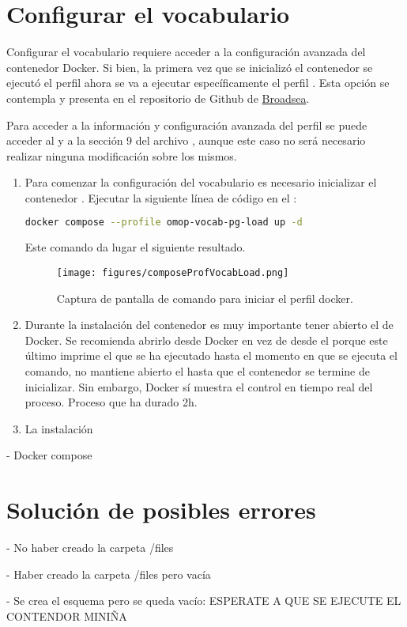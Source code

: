 \section{Configurar el vocabulario}

Configurar el vocabulario requiere acceder a la configuración avanzada del contenedor Docker. Si bien, la primera vez que se inicializó el contenedor se ejecutó el perfil  ahora se va a ejecutar específicamente el perfil . Esta opción se contempla y presenta en el repositorio de Github de \href{https://github.com/OHDSI/Broadsea}{Broadsea}. 

Para acceder a la información y configuración avanzada del perfil se puede acceder al  y a la sección 9 del archivo , aunque este caso no será necesario realizar ninguna modificación sobre los mismos.

\begin{enumerate}

    \item Para comenzar la configuración del vocabulario es necesario inicializar el contenedor . Ejecutar la siguiente línea de código en el :

    \begin{lstlisting}[language=sh]
    docker compose --profile omop-vocab-pg-load up -d\end{lstlisting}

    Este comando da lugar el siguiente resultado.

      \begin{figure}[H]
        \centering
        \texttt{[image: figures/composeProfVocabLoad.png]}
        \caption{Captura de pantalla de comando para iniciar el perfil docker.}
        \label{fig:composeProfVocabLoad}
    \end{figure}

    \item Durante la instalación del contenedor es muy importante tener abierto el  de Docker. Se recomienda abrirlo desde Docker en vez de desde el  porque este último imprime el  que se ha ejecutado hasta el momento en que se ejecuta el comando, no mantiene abierto el  hasta que el contenedor se termine de inicializar. Sin embargo, Docker sí muestra el control en tiempo real del proceso. Proceso que ha durado 2h.

    \item La instalación 
    

    
\end{enumerate}

- Docker compose

\section{Solución de posibles errores}

- No haber creado la carpeta /files

- Haber creado la carpeta /files pero vacía

- Se crea el esquema pero se queda vacío: ESPERATE A QUE SE EJECUTE EL CONTENDOR MINIÑA